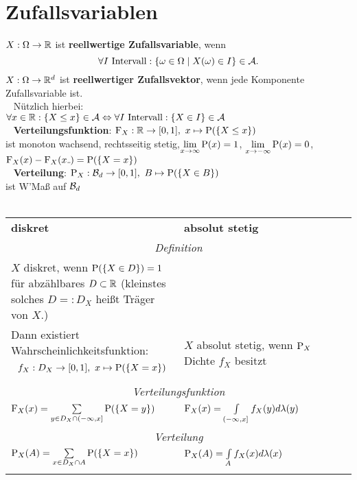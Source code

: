 \section{Zufallsvariablen}
$X:\Omega\to\R$ ist \textbf{reellwertige Zufallsvariable}, wenn
\[\forall I \text{ Intervall}: \{\omega\in\Omega\mid X(\omega)\in I\}\in\A.\]
$X:\Omega\to\R^d$ ist \textbf{reellwertiger Zufallsvektor}, wenn jede Komponente Zufallsvariable ist.\\
\ \newline
Nützlich hierbei:\\
$\forall x\in\R:\{X\leq x\}\in\A
\Leftrightarrow\forall I \text{ Intervall}:\{X\in I\}\in\A$\\
\ \newline
\textbf{Verteilungsfunktion}: $\F_X:\R\to[0,1],\ x\mapsto\P(\{X\leq x\})$\\
ist monoton wachsend, rechtsseitig stetig,$\lim\limits_{x\to\infty}\P(x)=1$,
$\lim\limits_{x\to -\infty}\P(x)=0$, $\F_X(x)-\F_X(x\mathunderscore)=\P(\{X=x\})$\\
\ \newline
\textbf{Verteilung}: $\P_X: \B{d}\to [0,1],\ B\mapsto\P(\{X\in B\})$\\
ist W'Maß auf $\B{d}$\\
\ \newline\newline

\begin{table}[h]
\centering
\begin{tabular}{p{0.5\linewidth} p{0.5\linewidth}}
\textbf{diskret} & \textbf{absolut stetig} \\
\multicolumn{2}{c}{\textit{Definition}}  \\
$X$ diskret, wenn $\P(\{X\in D\})=1$ für abzählbares $D\subset\R$ (kleinstes solches $D=:D_X$ heißt Träger von $X$.) & \\
Dann existiert Wahrscheinlichkeitsfunktion:
\[f_X:D_X\to [0,1],\ x\mapsto \P(\{X=x\})\] &        
$X$ absolut stetig, wenn $\P_X$ Dichte $f_X$ besitzt\\
\multicolumn{2}{c}{\textit{Verteilungsfunktion}}  \\
$\F_X(x)=\sum\limits_{y\in D_X\cap (-\infty, x]} \P(\{X=y\})$ &
$\F_X(x)=\int\limits_{(-\infty,x]}f_X(y) d\lambda(y)$ \\
\multicolumn{2}{c}{\textit{Verteilung}}  \\
$\P_X(A)=\sum\limits_{x\in D_X\cap A} \P(\{X=x\})$ &
$\P_X(A)=\int\limits_{A} f_X(x) d\lambda(x)$ \\
        &               
\end{tabular}
\end{table}



